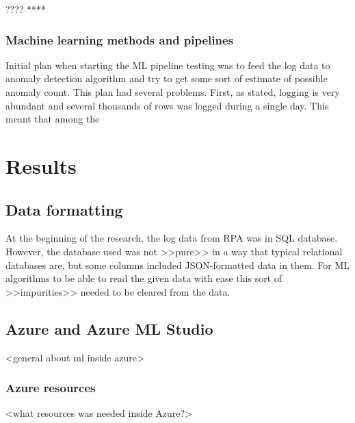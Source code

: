 \documentclass[english, 12pt, a4paper, elec, utf8, a-1b, online]{aaltothesis}
\begin{document}
???? ****


\subsubsection*{Machine learning methods and pipelines}
Initial plan when starting the ML pipeline testing
was to feed the log data to anomaly detection algorithm
and try to get some sort of estimate of possible anomaly count.
This plan had several problems.
First, as stated, logging is very abundant
and several thousands of rows was logged %
during a single day.
This meant that among the

\clearpage




\section{Results}\label{sec:results}


\subsection{Data formatting}\label{subsec:data-formatting}
At the beginning of the research,
the log data from RPA was in SQL database.
However,
the database used was not >>pure>>
in a way that typical relational databases are,
but some columns included JSON-formatted data in them.
For ML algorithms to be able to read the given data with ease
this sort of >>impurities>> needed to be cleared from the data.


\subsection{Azure and Azure ML Studio}\label{subsec:azure-and-azure-ml-studio}

<general about ml inside azure>

\subsubsection*{Azure resources}

<what resources was needed inside Azure?>
\end{document}
